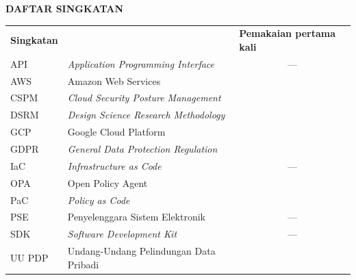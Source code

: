 \cleardoublepage
\vspace{2cm}
\begin{center}
{\fontsize{14}{16.8}\selectfont\textbf{DAFTAR SINGKATAN}}\\[1em]
\end{center}
\label{chap:singkatan}
\setcounter{chapter}{0}
\setcounter{section}{0}
\vspace{2em}




\begin{longtable}{@{} l >{\raggedright\arraybackslash}p{7.5cm} c @{}}
\multicolumn{1}{l}{\textbf{Singkatan}} & \multicolumn{1}{l}{\textbf{Deskripsi}} & \multicolumn{1}{l}{\parbox[c]{3.5cm}{\raggedright \textbf{Pemakaian pertama kali}}} \\


API & \textit{Application Programming Interface} & --- \\
AWS & Amazon Web Services & \pageref{abbr:aws} \\
CSPM & \textit{Cloud Security Posture Management} & \pageref{abbr:cspm} \\
DSRM & \textit{Design Science Research Methodology} & \pageref{abbr:dsrm} \\
GCP & Google Cloud Platform & \pageref{abbr:gcp} \\
GDPR & \textit{General Data Protection Regulation} & \pageref{abbr:gdpr} \\
IaC & \textit{Infrastructure as Code} & --- \\
OPA & Open Policy Agent & \pageref{abbr:opa} \\
PaC & \textit{Policy as Code} & \pageref{abbr:pac} \\
PSE & Penyelenggara Sistem Elektronik & --- \\
SDK & \textit{Software Development Kit} & --- \\
UU PDP & Undang-Undang Pelindungan Data Pribadi & \pageref{abbr:uupdp} \\

\end{longtable}

